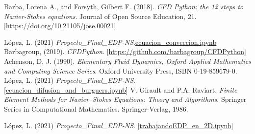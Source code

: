 \documentclass[A4,10pt]{article}
\begin{document}
\begin{thebibliography}{99}

	 Barba, Lorena A., and Forsyth, Gilbert F. (2018). \textit{CFD Python: the 12 steps to Navier-Stokes equations}. Journal of Open Source Education, 21. [\href{https://doi.org/10.21105/jose.00021}{https://doi.org/10.21105/jose.00021}]
	
		 López, L. (2021) \textit{Proyecto\_Final\_EDP-NS}.\href{https://github.com/LeonardoLopez2218061/Proyecto_Final_EDP-NS/blob/main/Desarrollo_Jupyter/ecuacion_conveccion.ipynb}{ecuacion\_conveccion.ipynb}
 Barbagroup, (2019). \textit{CFDPython}. [\href{https://github.com/barbagroup/CFDPython}{https://github.com/barbagroup/CFDPython}]
 Achenson, D. J. (1990). \textit{Elementary Fluid Dynamics, Oxford Applied Mathematics and Computing Science Series}. Oxford University Press, ISBN 0-19-859679-0.
	 López, L. (2021) \textit{Proyecto\_Final\_EDP-NS}. [\href{https://github.com/LeonardoLopez2218061/Proyecto_Final_EDP-NS/blob/main/Desarrollo_Jupyter/ecuacion_difusion_and_burguers.ipynb}{ecuacion\_difusion\_and\_burguers.ipynb}]
 V. Girault and P.A. Raviart. \textit{Finite Element Methods for Navier–Stokes Equations: Theory and Algorithms}. Springer Series in Computational Mathematics. Springer-Verlag, 1986.

	 López, L. (2021) \textit{Proyecto\_Final\_EDP-NS}. [\href{https://github.com/LeonardoLopez2218061/Proyecto_Final_EDP-NS/blob/main/Desarrollo_Jupyter/trabajandoEDP_en_2D.ipynb}{trabajandoEDP\_en\_2D.ipynb}]

\end{thebibliography}
\end{document}
